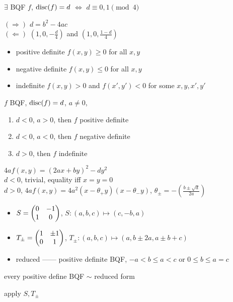 \begin{lemma}
    $\exists$ BQF $f$, $\textnormal{disc}(f) = d$ $\iff$ $d \equiv 0, 1 \pmod 4$
\end{lemma}
\begin{pf}
    $(\Rightarrow)$ $d = b^2 - 4ac$\\
    $(\Leftarrow)$ $(1, 0, -\frac{d}{4})$ and $(1, 0, \frac{1-d}{4})$
\end{pf}

\begin{itemize}
    \item positive definite $f(x,y) \geq 0$ for all $x, y$
    \item negative definite $f(x, y) \leq 0$ for all $x, y$
    \item indefinite $f(x, y) > 0$ and $f(x', y') < 0$ for some $x, y, x', y'$
\end{itemize}

\begin{lemma}
    $f$ BQF, $\textnormal{disc}(f) = d$, $a \neq 0$,
    \begin{enumerate}
        \item $d < 0$, $a > 0$, then $f$ positive definite
        \item $d < 0$, $a < 0$, then $f$ negative definite
        \item $d > 0$, then $f$ indefinite
    \end{enumerate}
\end{lemma}
\begin{pf}
    $4af(x,y) = (2ax + by)^2 - dy^{2}$\\
    $d < 0$, trivial, equality iff $x = y = 0$\\
    $d > 0$, $4af(x, y) = 4a^2(x - \theta_+ y)(x - \theta_- y)$, $\theta_\pm = -\left(\frac{b \pm \sqrt{d}}{2a}\right)$
\end{pf}

\begin{itemize}
    \item $S = \begin{pmatrix} 0 & -1 \\ 1 & 0 \end{pmatrix}$, $S:(a, b, c) \mapsto (c, -b, a)$
    \item $T_\pm = \begin{pmatrix} 1 & \pm 1 \\ 0 & 1 \end{pmatrix}$, $T_\pm:(a, b, c)\mapsto (a, b \pm 2a, a \pm b +c)$
    \item reduced ------ positive definite BQF, $-a < b \leq a < c$ or $0 \leq b \leq a = c$
\end{itemize}

\begin{lemma}
    every positive define BQF $\sim$ reduced form
\end{lemma}
\begin{pf}
    apply $S, T_\pm$
\end{pf}

